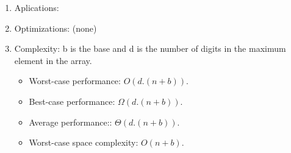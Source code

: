 \documentclass[12pt]{article}
\begin{document}
\begin{enumerate}
\begin{algorithm}[H]
\begin{algorithmic}[1]
            \end{algorithmic}
        \end{algorithm}
        \item Aplications:
        \item Optimizations: (none)
        \item Complexity: b is the base and d is the number of digits in the maximum element in the array.
        \begin{itemize}
            \item Worst-case performance: $O(d.(n+b))$.
            \item Best-case performance: $\Omega(d.(n+b))$.
            \item Average performance:: $\Theta(d.(n+b))$.
            \item Worst-case space complexity: $O(n+b)$.
        \end{itemize}
    \end{enumerate}
\end{document}
